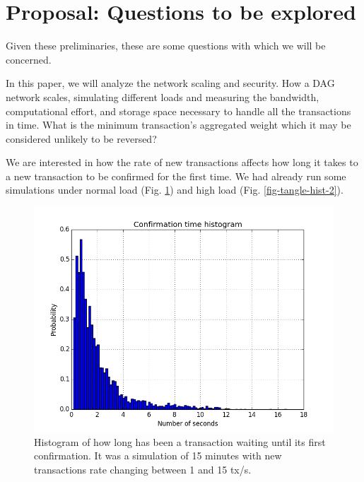 \section{Proposal: Questions to be explored}

Given these preliminaries, these are some questions with which we will be concerned.

In this paper, we will analyze the network scaling and security. How a DAG network scales, simulating different loads and measuring the bandwidth, computational effort, and storage space necessary to handle all the transactions in time. What is the minimum transaction's aggregated weight which it may be considered unlikely to be reversed?

We are interested in how the rate of new transactions affects how long it takes to a new transaction to be confirmed for the first time. We had already run some simulations under normal load (Fig. \ref{fig-tangle-hist}) and high load (Fig. \ref{fig-tangle-hist-2}).

\begin{figure}[ht]
\centering\includegraphics[width=\textwidth]{./images01/fig-tangle-hist.png}
\caption{Histogram of how long has been a transaction waiting until its first confirmation. It was a simulation of 15 minutes with new transactions rate changing between 1 and 15 tx/s.\label{fig-tangle-hist}}
\end{figure}

